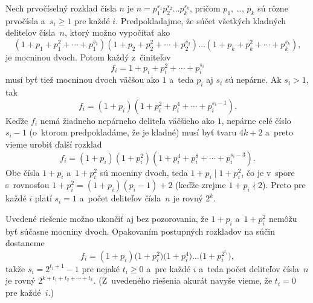 {%
Nech prvočíselný rozklad čísla $n$ je $n=p_1^{s_1}p_2^{s_2}\dots p_k^{s_k}$, pričom
$p_1$, \dots, $p_k$ sú rôzne prvočísla a~$s_i\ge1$ pre každé $i$. Predpokladajme,
že súčet všetkých kladných deliteľov čísla~$n$, ktorý možno vypočítať ako
$$
(1+p_1+p_1^2+\cdots+p_1^{s_1})
(1+p_2+p_2^2+\cdots+p_2^{s_2})\dots(1+p_k+p_k^2+\cdots+p_k^{s_k}),
$$
je mocninou dvoch. Potom každý z~činiteľov
$$
f_i=1+p_i+p_i^2+\cdots+p_i^{s_i}
$$
musí byť tiež mocninou dvoch väčšou ako $1$
a~teda $p_i$ aj $s_i$ sú nepárne. Ak $s_i>1$, tak
$$
f_i=(1+p_i)(1+p_i^2+p_i^4+\cdots+p_i^{s_i-1}).
$$
Keďže $f_i$ nemá žiadneho nepárneho deliteľa väčšieho ako $1$, nepárne celé číslo $s_i-1$ (o~ktorom predpokladáme, že je kladné) musí byť tvaru $4k+2$ a~preto vieme urobiť ďalší rozklad
$$
f_i=(1+p_i)(1+p_i^2)(1+p_i^4+p_i^8+\cdots+p_i^{s_i-3}).
$$
Obe čísla $1+p_i$ a~$1+p_i^2$ sú mocniny dvoch, teda $1+p_i\mid 1+p_i^2$, čo je v~spore s~rovnosťou $1+p_i^2=(1+p_i)(p_i-1)+2$ (keďže zrejme $1+p_i\nmid 2$).
Preto pre každé $i$ platí $s_i=1$ a~počet deliteľov čísla~$n$ je rovný $2^k$.

\poznamka
Uvedené riešenie možno ukončiť aj bez pozorovania, že $1+p_i$ a~$1+p_i^2$ nemôžu byť súčasne mocniny dvoch. Opakovaním postupných rozkladov na súčin dostaneme
$$
f_i=(1+p_i)\bigl(1+p_i^2\bigr)\bigl(1+p_i^4\bigr)\dots
\bigl(1+p_i^{2^{t_i}}\bigr),
$$
takže $s_i=2^{t_i+1}-1$ pre nejaké $t_i\ge0$ a~pre každé $i$ a~teda počet deliteľov čísla~$n$ je rovný
$2^{k+t_1+t_2+\cdots+t_k}$. (Z~uvedeného riešenia akurát navyše vieme, že $t_i=0$ pre každé~$i$.)
}
